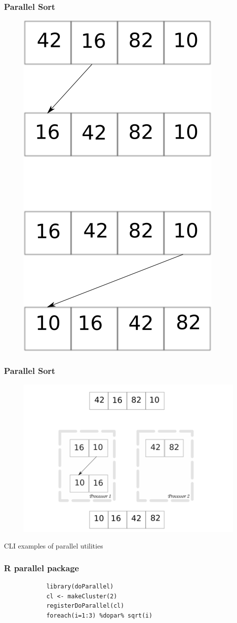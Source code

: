
\begin{frame}
		\frametitle{Parallel Sort}
		\begin{figure}
				\includegraphics[width=0.3\linewidth]{figures/diagrams/sort/serialsort}
		\end{figure}	
\end{frame}

\begin{frame}
		\frametitle{Parallel Sort}
		\begin{figure}
				\includegraphics[width=0.8\linewidth]{figures/diagrams/sort/parallelsort}
		\end{figure}	
\end{frame}

\begin{frame}
		CLI examples of parallel utilities
\end{frame}


\begin{frame}[fragile]
		\frametitle{R parallel package}
		\center
		\begin{verbatim}
			library(doParallel)
			cl <- makeCluster(2)
			registerDoParallel(cl)
			foreach(i=1:3) %dopar% sqrt(i)
		\end{verbatim}
\end{frame}

